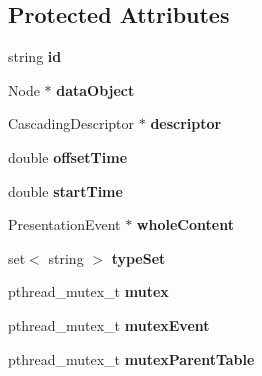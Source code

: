 \subsection*{Protected Attributes}
\begin{CompactItemize}
\item 
string {\bf id}\label{classbr_1_1pucrio_1_1telemidia_1_1ginga_1_1ncl_1_1model_1_1components_1_1ExecutionObject_d97b05b88ce9080f35b157cfacc8eb69}

\item 
Node $\ast$ {\bf dataObject}\label{classbr_1_1pucrio_1_1telemidia_1_1ginga_1_1ncl_1_1model_1_1components_1_1ExecutionObject_86abf433320f2b8ee7a2e0736eb55182}

\item 
CascadingDescriptor $\ast$ {\bf descriptor}\label{classbr_1_1pucrio_1_1telemidia_1_1ginga_1_1ncl_1_1model_1_1components_1_1ExecutionObject_e3d7779d4539dc4fab92147b7187e9d2}

\item 
double {\bf offsetTime}\label{classbr_1_1pucrio_1_1telemidia_1_1ginga_1_1ncl_1_1model_1_1components_1_1ExecutionObject_3eb23547dd9afd7243d9b93d5f0c07f6}

\item 
double {\bf startTime}\label{classbr_1_1pucrio_1_1telemidia_1_1ginga_1_1ncl_1_1model_1_1components_1_1ExecutionObject_0a07a521d3525b9b7dc70c0a625adea0}

\item 
PresentationEvent $\ast$ {\bf wholeContent}\label{classbr_1_1pucrio_1_1telemidia_1_1ginga_1_1ncl_1_1model_1_1components_1_1ExecutionObject_d1f65e9f7cc6af1f8b74760e85fb6e20}

\item 
set$<$ string $>$ {\bf typeSet}\label{classbr_1_1pucrio_1_1telemidia_1_1ginga_1_1ncl_1_1model_1_1components_1_1ExecutionObject_145b3afaa194308141d367cc1393d565}

\item 
pthread\_\-mutex\_\-t {\bf mutex}\label{classbr_1_1pucrio_1_1telemidia_1_1ginga_1_1ncl_1_1model_1_1components_1_1ExecutionObject_4acff8232e4aec9cd5c6dc200ac55ef3}

\item 
pthread\_\-mutex\_\-t {\bf mutexEvent}\label{classbr_1_1pucrio_1_1telemidia_1_1ginga_1_1ncl_1_1model_1_1components_1_1ExecutionObject_38060cc046ee2f0434f4281a14ad3196}

\item 
pthread\_\-mutex\_\-t {\bf mutexParentTable}\label{classbr_1_1pucrio_1_1telemidia_1_1ginga_1_1ncl_1_1model_1_1components_1_1ExecutionObject_4198e09a41b9dab04a559c39a17c4567}


\end{CompactItemize}
